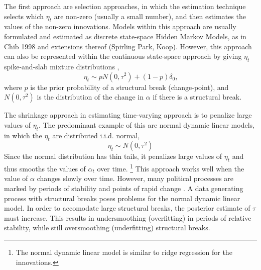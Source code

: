 \documentclass{article}
\begin{document}
The first approach are selection approaches, in which the estimation technique selects which $\eta_{t}$ are non-zero (usually a small number), and then estimates the values of the non-zero innovations.
Models within this approach are usually formulated and estimated as discrete state-space Hidden Markov Models, as in Chib 1998 and extensions thereof (Spirling Park, Koop).
However, this approach can also be represented within the continuous state-space approach by giving $\eta_{t}$ spike-and-slab mixture distributions \parencite{GiordaniKohn2008},
\begin{equation}
  \label{eq:1}
  \eta_{t} \sim p N(0, \tau^{2}) + (1 - p) \delta_{0} \text{,}
\end{equation}
where $p$ is the prior probability of a structural break (change-point), and $N(0, \tau^{2})$ is the distribution of the change in $\alpha$ if there is a structural break.

The shrinkage approach in estimating time-varying approach is to penalize large values of $\eta_{t}$. 
The predominant example of this are normal dynamic linear models, in which the $\eta_{t}$ are distributed i.i.d. normal,
\begin{equation}
  \label{eq:4}
  \eta_{t} \sim N(0, \tau^{2})
\end{equation}
Since the normal distribution has thin tails, it penalizes large values of $\eta_{t}$ and thus smooths the values of $\alpha_{t}$ over time.
\footnote{The normal dynamic linear model is similar to ridge regression for the innovations.}
This approach works well when the value of $\alpha$ changes slowly over time.
However, many political processes are marked by periods of stability and points of rapid change \parencite{RatkovicEng2010}.
A data generating process with structural breaks poses problems for the normal dynamic linear model.
In order to accomodate large structural breaks, the posterior estimate of $\tau$ must increase. 
This results in undersmoothing (overfitting) in periods of relative stability, while still oversmoothing (underfitting) structural breaks.
\end{document}
